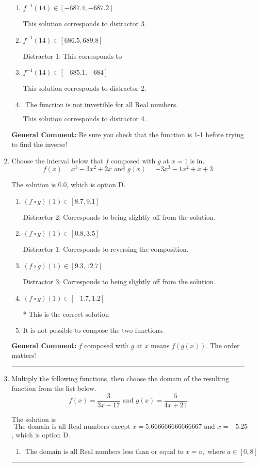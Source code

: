 \documentclass{extbook}[14pt]
\newcommand{\litem}[1]{\item #1

\rule{\textwidth}{0.4pt}}
\begin{document}
\begin{enumerate}
{\begin{enumerate}[label=\Alph*.]
* This is the correct solution.
\item \( f^{-1}(14) \in [-687.4, -687.2] \)

 This solution corresponds to distractor 3.
\item \( f^{-1}(14) \in [686.5, 689.8] \)

 Distractor 1: This corresponds to 
\item \( f^{-1}(14) \in [-685.1, -684] \)

 This solution corresponds to distractor 2.
\item \( \text{ The function is not invertible for all Real numbers. } \)

 This solution corresponds to distractor 4.
\end{enumerate}

\textbf{General Comment:} Be sure you check that the function is 1-1 before trying to find the inverse!
}
\litem{
Choose the interval below that $f$ composed with $g$ at $x=1$ is in.
\[ f(x) = x^{3} -3 x^{2} +2 x \text{ and } g(x) = -3x^{3} -1 x^{2} +x + 3 \]

The solution is \( 0.0 \), which is option D.\begin{enumerate}[label=\Alph*.]
\item \( (f \circ g)(1) \in [8.7, 9.1] \)

 Distractor 2: Corresponds to being slightly off from the solution.
\item \( (f \circ g)(1) \in [0.8, 3.5] \)

 Distractor 1: Corresponds to reversing the composition.
\item \( (f \circ g)(1) \in [9.3, 12.7] \)

 Distractor 3: Corresponds to being slightly off from the solution.
\item \( (f \circ g)(1) \in [-1.7, 1.2] \)

* This is the correct solution
\item \( \text{It is not possible to compose the two functions.} \)


\end{enumerate}

\textbf{General Comment:} $f$ composed with $g$ at $x$ means $f(g(x))$. The order matters!
}
\litem{
Multiply the following functions, then choose the domain of the resulting function from the list below.
\[ f(x) = \frac{3}{3x-17} \text{ and } g(x) = \frac{5}{4x+21} \]

The solution is \( \text{ The domain is all Real numbers except } x = 5.666666666666667 \text{ and } x = -5.25 \), which is option D.\begin{enumerate}[label=\Alph*.]
\item \( \text{ The domain is all Real numbers less than or equal to } x = a, \text{ where } a \in [0, 8] \)



\end{enumerate}}
\end{enumerate}
\end{document}
